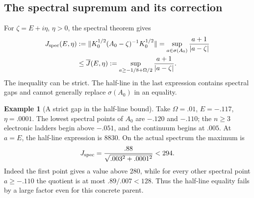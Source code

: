 \documentclass[11pt]{article}
\numberwithin{equation}{section}
\theoremstyle{definition}
\newtheorem{example}[theorem]{Example}
\theoremstyle{remark}
\begin{document}
\subsection{The spectral supremum and its correction}
\label{p4h:sec:gap}

For $\zeta=E+i\eta$, $\eta>0$, the spectral theorem gives
\begin{align}
 J_{\rm spec}(E,\eta)
 &:=\|K_0^{1/2}(A_0-\zeta)^{-1}K_0^{1/2}\|
   =\sup_{a\in\sigma(A_0)}\frac{a+1}{|a-\zeta|}
 \notag\\
 &\leq\overline J(E,\eta):=
     \sup_{a\geq-1/8+\Omega/2}\frac{a+1}{|a-\zeta|}.
 \label{p4h:eq:Jspectrum}
\end{align}
The inequality can be strict. The half-line in the last
expression contains spectral gaps and cannot generally
replace $\sigma(A_0)$ in an equality.

\begin{example}[A strict gap in the half-line bound]
\label{p4h:ex:gap}
Take $\Omega=.01$, $E=-.117$, $\eta=.0001$.
The lowest spectral points of $A_0$ are $-.120$ and $-.110$;
the $n\geq3$ electronic ladders begin above $-.051$, and
the continuum begins at $.005$. At $a=E$, the half-line
expression is $8830$. On the actual spectrum the maximum is
\[
 J_{\rm spec}=\frac{.88}{\sqrt{.003^2+.0001^2}}<294.
\]
Indeed the first point gives a value above $280$, while for
every other spectral point $a\geq-.110$ the quotient is
at most $.89/.007<128$. Thus the half-line equality fails
by a large factor even for this concrete parent.
\end{example}
\end{document}

